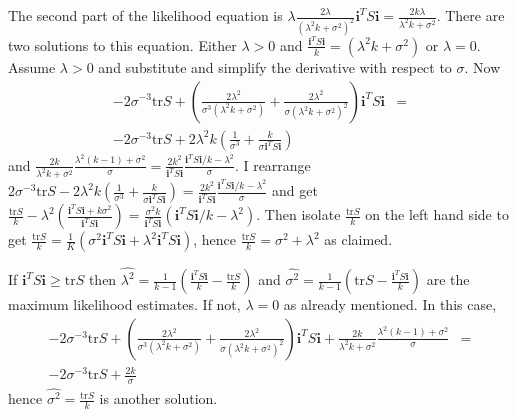 \documentclass{article}
\makeatletter
\theoremstyle{plain}
\theoremstyle{plain}
\theoremstyle{definition}
\theoremstyle{remark}
\theoremstyle{definition}
\theoremstyle{plain}
\theoremstyle{plain}
\theoremstyle{definition}
\newenvironment{proof}[1][\protect\proofname]{\par
	\normalfont\topsep6\p@\@plus6\p@\relax
	\trivlist
	\itemindent\parindent
	\item[\hskip\labelsep\scshape #1]\ignorespaces
}{%
	\endtrivlist\@endpefalse
}
\providecommand{\proofname}{Proof}
\makeatother
\begin{document}
\begin{proof}[Proof of Theorem \ref{thm:ML}]
The second part of the likelihood equation is $\lambda$$\frac{2\lambda}{\left(\lambda^{2}k+\sigma^{2}\right)^{2}}\mathbf{i}^{T}S\mathbf{i}=\frac{2k\lambda}{\lambda^{2}k+\sigma^{2}}$.
There are two solutions to this equation. Either $\lambda>0$ and
$\frac{\mathbf{i}^{T}S\mathbf{i}}{k}=\left(\lambda^{2}k+\sigma^{2}\right)$
or $\lambda=0$. Assume $\lambda>0$ and substitute and simplify the
derivative with respect to $\sigma$. Now
\begin{eqnarray*}
-2\sigma^{-3}\textrm{tr}S+\left(\frac{2\lambda^{2}}{\sigma^{3}\left(\lambda^{2}k+\sigma^{2}\right)}+\frac{2\lambda^{2}}{\sigma\left(\lambda^{2}k+\sigma^{2}\right)^{2}}\right)\mathbf{i}^{T}S\mathbf{i} & =\\
-2\sigma^{-3}\textrm{tr}S+2\lambda^{2}k\left(\frac{1}{\sigma^{3}}+\frac{k}{\sigma\mathbf{i}^{T}S\mathbf{i}}\right)
\end{eqnarray*}
and $\frac{2k}{\lambda^{2}k+\sigma^{2}}\frac{\lambda^{2}\left(k-1\right)+\sigma^{2}}{\sigma}=\frac{2k^{2}}{\mathbf{i}^{T}S\mathbf{i}}\frac{\mathbf{i}^{T}S\mathbf{i}/k-\lambda^{2}}{\sigma}$.
I rearrange $2\sigma^{-3}\textrm{tr}S-2\lambda^{2}k\left(\frac{1}{\sigma^{3}}+\frac{k}{\sigma\mathbf{i}^{T}S\mathbf{i}}\right)=\frac{2k^{2}}{\mathbf{i}^{T}S\mathbf{i}}\frac{\mathbf{i}^{T}S\mathbf{i}/k-\lambda^{2}}{\sigma}$
and get $\frac{\textrm{tr}S}{k}-\lambda^{2}\left(\frac{\mathbf{i}^{T}S\mathbf{i}+k\sigma^{2}}{\mathbf{i}^{T}S\mathbf{i}}\right)=\frac{\sigma^{2}k}{\mathbf{i}^{T}S\mathbf{i}}\left(\mathbf{i}^{T}S\mathbf{i}/k-\lambda^{2}\right)$.
Then isolate $\frac{\textrm{tr}S}{k}$ on the left hand side to get
$\frac{\textrm{tr}S}{k}=\frac{1}{K}\left(\sigma^{2}\mathbf{i}^{T}S\mathbf{i}+\lambda^{2}\mathbf{i}^{T}S\mathbf{i}\right)$,
hence $\frac{\textrm{tr}S}{k}=\sigma^{2}+\lambda^{2}$ as claimed.

If $\mathbf{i}^{T}S\mathbf{i}\geq\textrm{tr}S$ then $\hat{\lambda^{2}}=\frac{1}{k-1}\left(\frac{\mathbf{i}^{T}S\mathbf{i}}{k}-\frac{\textrm{tr}S}{k}\right)$
and $\hat{\sigma^{2}}=\frac{1}{k-1}\left(\textrm{tr}S-\frac{\mathbf{i}^{T}S\mathbf{i}}{k}\right)$
are the maximum likelihood estimates. If not, $\lambda=0$ as already
mentioned. In this case,
\begin{eqnarray*}
-2\sigma^{-3}\textrm{tr}S+\left(\frac{2\lambda^{2}}{\sigma^{3}\left(\lambda^{2}k+\sigma^{2}\right)}+\frac{2\lambda^{2}}{\sigma\left(\lambda^{2}k+\sigma^{2}\right)^{2}}\right)\mathbf{i}^{T}S\mathbf{i}+\frac{2k}{\lambda^{2}k+\sigma^{2}}\frac{\lambda^{2}\left(k-1\right)+\sigma^{2}}{\sigma} & =\\
-2\sigma^{-3}\textrm{tr}S+\frac{2k}{\sigma}
\end{eqnarray*}
hence $\hat{\sigma^{2}}=\frac{\textrm{tr}S}{k}$ is another solution.


\end{proof}
\end{document}
